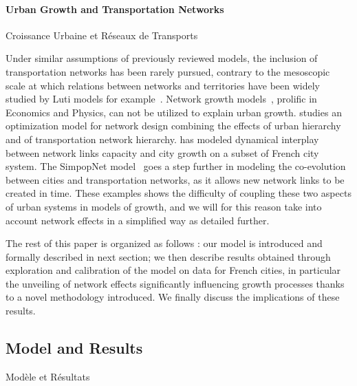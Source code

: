 

\paragraph{Urban Growth and Transportation Networks}{Croissance Urbaine et Réseaux de Transports}


Under similar assumptions of previously reviewed models, the inclusion of transportation networks has been rarely pursued, contrary to the mesoscopic scale at which relations between networks and territories have been widely studied by Luti models for example~\citep{chang2006models}. Network growth models~\citep{xie2009modeling}, prolific in Economics and Physics, can not be utilized to explain urban growth. \cite{bigotte2010integrated} studies an optimization model for network design combining the effects of urban hierarchy and of transportation network hierarchy. \cite{baptiste1999interactions} has modeled dynamical interplay between network links capacity and city growth on a subset of French city system. The SimpopNet model~\citep{schmitt2014modelisation} goes a step further in modeling the co-evolution between cities and transportation networks, as it allows new network links to be created in time. These examples shows the difficulty of coupling these two aspects of urban systems in models of growth, and we will for this reason take into account network effects in a simplified way as detailed further.


The rest of this paper is organized as follows : our model is introduced and formally described in next section; we then describe results obtained through exploration and calibration of the model on data for French cities, in particular the unveiling of network effects significantly influencing growth processes thanks to a novel methodology introduced. We finally discuss the implications of these results.








\subsection{Model and Results}{Modèle et Résultats}




